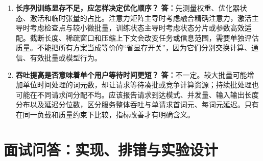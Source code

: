 \documentclass[UTF8,12pt,a4paper,fontset=fandol]{ctexart}
\begin{document}
\begin{enumerate}[resume*=trquestions]
\item \textbf{长序列训练显存不足，应怎样决定优化顺序？}
\textbf{答：}先测量权重、优化器状态、激活和临时张量的占比。注意力矩阵主导时考虑融合精确注意力，激活主导时考虑检查点与较小微批量，训练状态主导时考虑状态分片或参数高效适配。截断长度、稀疏窗口和压缩上下文会改变任务或信息范围，需要单独评估质量。不能把所有方案当成等价的“省显存开关”，因为它们分别交换计算、通信、有效批量或模型行为。

\item \textbf{吞吐提高是否意味着单个用户等待时间更短？}
\textbf{答：}不一定。较大批量可能增加单位时间处理的词元数，却让请求等待凑批或竞争计算资源；持续批处理也可能在不同请求间分配不均。应该报告请求到达模式、并发量、输入输出长度分布以及延迟分位数，区分服务整体吞吐与单请求首词元、每词元延迟。只有在同一负载和质量约束下比较，指标改善才有明确含义。
\end{enumerate}

\section{面试问答：实现、排错与实验设计}
\label{sec:tr-qa-debug}
\end{document}

